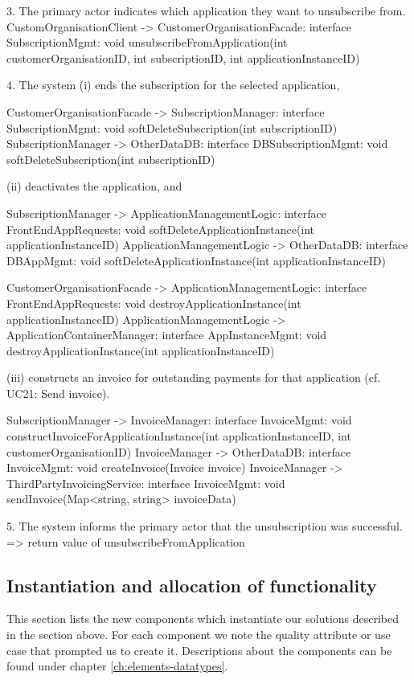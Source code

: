 {{{{{{{{{{{{{{        3. The primary actor indicates which application they want to unsubscribe from.
            CustomOrganisationClient -> CustomerOrganisationFacade: interface SubscriptionMgmt: void unsubscribeFromApplication(int customerOrganisationID, int subscriptionID, int applicationInstanceID)

        4. The system
           (i) ends the subscription for the selected application,

                CustomerOrganisationFacade -> SubscriptionManager: interface SubscriptionMgmt: void softDeleteSubscription(int subscriptionID)
                SubscriptionManager -> OtherDataDB: interface DBSubscriptionMgmt: void softDeleteSubscription(int subscriptionID)

            (ii) deactivates the application, and

                SubscriptionManager -> ApplicationManagementLogic: interface FrontEndAppRequests: void softDeleteApplicationInstance(int applicationInstanceID)
                ApplicationManagementLogic -> OtherDataDB: interface DBAppMgmt: void softDeleteApplicationInstance(int applicationInstanceID)

                CustomerOrganisationFacade -> ApplicationManagementLogic: interface FrontEndAppRequests: void destroyApplicationInstance(int applicationInstanceID)
                ApplicationManagementLogic -> ApplicationContainerManager: interface AppInstanceMgmt: void destroyApplicationInstance(int applicationInstanceID)

            (iii) constructs an invoice for outstanding payments for that application (cf. UC21: Send invoice).

                SubscriptionManager -> InvoiceManager: interface InvoiceMgmt: void constructInvoiceForApplicationInstance(int applicationInstanceID, int customerOrganisationID)
                InvoiceManager -> OtherDataDB: interface InvoiceMgmt: void createInvoice(Invoice invoice)
                InvoiceManager -> ThirdPartyInvoicingService: interface InvoiceMgmt: void sendInvoice(Map<string, string> invoiceData)

        5. The system informs the primary actor that the unsubscription was successful.
            => return value of unsubscribeFromApplication


\subsection{Instantiation and allocation of functionality}
    This section lists the new components which instantiate our solutions
    described in the section above. For each component we note the quality
    attribute or use case that prompted us to create it. Descriptions about
    the components can be found under chapter \ref{ch:elements-datatypes}. \\

}}}}}}}}}}}}}}

